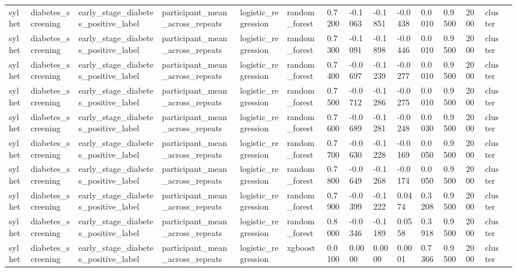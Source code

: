 \begin{tabular}{lllllllllllllll}
sylhet & diabetes\_screening & early\_stage\_diabetes\_positive\_label & participant\_mean\_across\_repeats & logistic\_regression & random\_forest & 0.7200 & -0.1063 & -0.1851 & -0.0438 & 0.0010 & 0.9500 & 2000 & cluster &  \\
sylhet & diabetes\_screening & early\_stage\_diabetes\_positive\_label & participant\_mean\_across\_repeats & logistic\_regression & random\_forest & 0.7300 & -0.1091 & -0.1898 & -0.0446 & 0.0010 & 0.9500 & 2000 & cluster &  \\
sylhet & diabetes\_screening & early\_stage\_diabetes\_positive\_label & participant\_mean\_across\_repeats & logistic\_regression & random\_forest & 0.7400 & -0.0697 & -0.1239 & -0.0277 & 0.0010 & 0.9500 & 2000 & cluster &  \\
sylhet & diabetes\_screening & early\_stage\_diabetes\_positive\_label & participant\_mean\_across\_repeats & logistic\_regression & random\_forest & 0.7500 & -0.0712 & -0.1286 & -0.0275 & 0.0010 & 0.9500 & 2000 & cluster &  \\
sylhet & diabetes\_screening & early\_stage\_diabetes\_positive\_label & participant\_mean\_across\_repeats & logistic\_regression & random\_forest & 0.7600 & -0.0689 & -0.1281 & -0.0248 & 0.0030 & 0.9500 & 2000 & cluster &  \\
sylhet & diabetes\_screening & early\_stage\_diabetes\_positive\_label & participant\_mean\_across\_repeats & logistic\_regression & random\_forest & 0.7700 & -0.0630 & -0.1228 & -0.0169 & 0.0050 & 0.9500 & 2000 & cluster &  \\
sylhet & diabetes\_screening & early\_stage\_diabetes\_positive\_label & participant\_mean\_across\_repeats & logistic\_regression & random\_forest & 0.7800 & -0.0649 & -0.1268 & -0.0174 & 0.0050 & 0.9500 & 2000 & cluster &  \\
sylhet & diabetes\_screening & early\_stage\_diabetes\_positive\_label & participant\_mean\_across\_repeats & logistic\_regression & random\_forest & 0.7900 & -0.0399 & -0.1222 & 0.0474 & 0.3208 & 0.9500 & 2000 & cluster &  \\
sylhet & diabetes\_screening & early\_stage\_diabetes\_positive\_label & participant\_mean\_across\_repeats & logistic\_regression & random\_forest & 0.8000 & -0.0346 & -0.1189 & 0.0558 & 0.3918 & 0.9500 & 2000 & cluster &  \\
sylhet & diabetes\_screening & early\_stage\_diabetes\_positive\_label & participant\_mean\_across\_repeats & logistic\_regression & xgboost & 0.0100 & 0.0000 & 0.0000 & 0.0001 & 0.7366 & 0.9500 & 2000 & cluster &  \\

\end{tabular}
